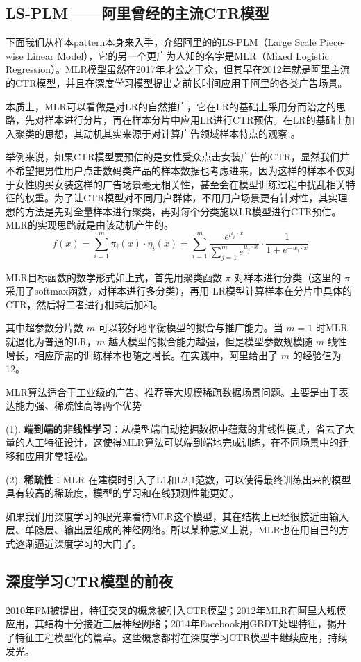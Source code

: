 \documentclass[12pt]{article}
\begin{document}
\subsection{LS-PLM——阿里曾经的主流CTR模型}
下面我们从样本pattern本身来入手，介绍阿里的的LS-PLM（Large Scale Piece-wise Linear Model），它的另一个更广为人知的名字是MLR（Mixed Logistic Regression）。MLR模型虽然在2017年才公之于众，但其早在2012年就是阿里主流的CTR模型，并且在深度学习模型提出之前长时间应用于阿里的各类广告场景。

本质上，MLR可以看做是对LR的自然推广，它在LR的基础上采用分而治之的思路，先对样本进行分片，再在样本分片中应用LR进行CTR预估。在LR的基础上加入聚类的思想，其动机其实来源于对计算广告领域样本特点的观察 。

举例来说，如果CTR模型要预估的是女性受众点击女装广告的CTR，显然我们并不希望把男性用户点击数码类产品的样本数据也考虑进来，因为这样的样本不仅对于女性购买女装这样的广告场景毫无相关性，甚至会在模型训练过程中扰乱相关特征的权重。为了让CTR模型对不同用户群体，不用用户场景更有针对性，其实理想的方法是先对全量样本进行聚类，再对每个分类施以LR模型进行CTR预估。MLR的实现思路就是由该动机产生的。
$$
f(x) = \sum_{i=1}^m\pi_i(x) \cdot \eta_i(x) = \sum_{i=1}^m \frac{e^{\mu_i \cdot x}}{\sum_{j=1}^m e^{\mu_j\cdot x}} \cdot \frac{1}{1+e^{-w_i\cdot x}}
$$

MLR目标函数的数学形式如上式，首先用聚类函数 $\pi$ 对样本进行分类（这里的 $\pi$ 采用了softmax函数，对样本进行多分类），再用 LR模型计算样本在分片中具体的 CTR，然后将二者进行相乘后加和。

其中超参数分片数 $m$ 可以较好地平衡模型的拟合与推广能力。当 $m=1$ 时MLR就退化为普通的LR，$m$ 越大模型的拟合能力越强，但是模型参数规模随 $m$ 线性增长，相应所需的训练样本也随之增长。在实践中，阿里给出了 $m$ 的经验值为12。

MLR算法适合于工业级的广告、推荐等大规模稀疏数据场景问题。主要是由于表达能力强、稀疏性高等两个优势

(1). \textbf{端到端的非线性学习}：从模型端自动挖掘数据中蕴藏的非线性模式，省去了大量的人工特征设计，这使得MLR算法可以端到端地完成训练，在不同场景中的迁移和应用非常轻松。

(2). \textbf{稀疏性}：MLR 在建模时引入了L1和L2,1范数，可以使得最终训练出来的模型具有较高的稀疏度，模型的学习和在线预测性能更好。

如果我们用深度学习的眼光来看待MLR这个模型，其在结构上已经很接近由输入层、单隐层、输出层组成的神经网络。所以某种意义上说，MLR也在用自己的方式逐渐逼近深度学习的大门了。

\subsection{深度学习CTR模型的前夜}
2010年FM被提出，特征交叉的概念被引入CTR模型；2012年MLR在阿里大规模应用，其结构十分接近三层神经网络；2014年Facebook用GBDT处理特征，揭开了特征工程模型化的篇章。这些概念都将在深度学习CTR模型中继续应用，持续发光。
\end{document}
